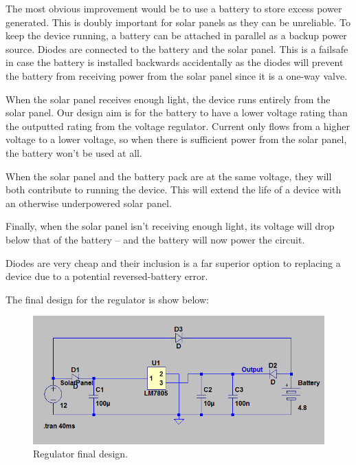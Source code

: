 The most obvious improvement would be to use a battery to store excess power generated. This is
doubly important for solar panels as they can be unreliable. To keep the device running, a battery
can be attached in parallel as a backup power source. Diodes are connected to the battery and the
solar panel. This is a failsafe in case the battery is installed backwards accidentally as the diodes will
prevent the battery from receiving power from the solar panel since it is a one-way valve.

When the solar panel receives enough light, the device runs entirely from the solar panel. Our design
aim is for the battery to have a lower voltage rating than the outputted rating from the voltage
regulator. Current only flows from a higher voltage to a lower voltage, so when there is sufficient
power from the solar panel, the battery won't be used at all.

When the solar panel and the battery pack are at the same voltage, they will both contribute to
running the device. This will extend the life of a device with an otherwise underpowered solar panel.

Finally, when the solar panel isn't receiving enough light, its voltage will drop below that of the
battery – and the battery will now power the circuit.

Diodes are very cheap and their inclusion is a far superior option to replacing a device due to a
potential reversed-battery error.

The final design for the regulator is show below:

\begin{figure}[H]
\begin{center}
\includegraphics[scale=0.4]{data/power/4.png}
\caption{Regulator final design.}
\label{fig:pow-4}
\end{center}
\end{figure}


